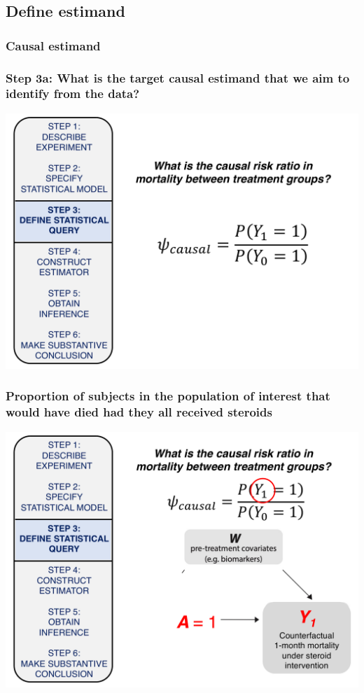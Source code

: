 \documentclass[t]{beamer}
\begin{document}
\subsection{Define estimand}

\subsubsection{Causal estimand}
\begin{frame}
  \frametitle{Step 3a: What is the target causal estimand that we aim to identify from the data?}
  \vspace{-20pt}
  \begin{center}
  \includegraphics[width = 1.05\textwidth]{figures/causalRR.pdf}
  \end{center}
\end{frame}

\begin{frame}
  \frametitle{Proportion of subjects in the population of interest that would have died had they all received steroids}
  \vspace{-20pt}
  \begin{center}
  \includegraphics[width = 1.05\textwidth]{figures/counterfactual_Y1.pdf}
  \end{center}
\end{frame}
\end{document}
